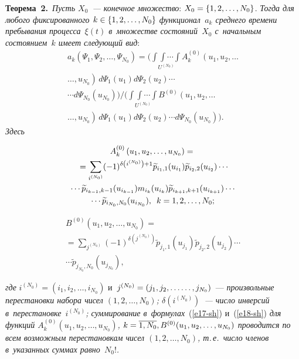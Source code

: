 \begin{multicols}{2}
\noindent
\textbf{Теорема~2.}\ \textit{Пусть $X_{0}$~--- конечное множество}: 
$X_{0}\hm=\{1,2,\dots,N_0 \}$. \textit{Тогда для любого фиксированного $k\hm\in \{1,2,\ldots 
,N_0\}$ функционал~$a_{k} $ среднего времени пребывания процесса~$\xi (t)$ 
в~множестве состояний~$X_{0} $ с~начальным состоянием~$k$ имеет сле\-ду\-ющий вид}:
\begin{multline}
\!a_{k} \left(\Psi_{1} ,\Psi_{2} ,\dots ,\Psi_{N_0} \right)\!=\!
\Bigg(\underset{U^{(N_0)}}{\int\!\!\!\int\cdots\int} A^{(0)}_{k} \left(u_{1} ,u_{2} 
,\ldots\right.\\
\left.\ldots ,u_{N_0} \right)\,d\Psi _{1} (u_{1} )d\Psi _{2} (u_{2} )\cdots\\
\cdots d\Psi _{N_0} (u_{N_0} )  
\Big)\!\!\Bigg/\!\!\Bigg(\underset{U^{(N_0)}}{\int\!\!\!\int\cdots\int} B^{(0)}\left(u_{1} ,u_{2} ,\ldots\right.\\
\left.\ldots ,u_{N_0} 
\right)\,d\Psi_{1} (u_{1} )d\Psi _{2} (u_{2} )\cdots d\Psi_{N_0} (u_{N_0})  \Bigg).
\label{e16-sh}
\end{multline}
\textit{Здесь}

\vspace*{-6pt}

\noindent
\begin{multline}
A^{(0)}_k\left(u_1, u_2,\ldots ,u_{N_0}\right)={}\\
{}=\sum\limits_{i^{(N_0)}}
(-1)^{\delta\left(i^{(N_0)}\right)+1}\widetilde{p}_{i_1,1}(u_{i_1})\widetilde{p}_{i_2,2}
(u_{i_2})\cdots\\
\cdots \widetilde{p}_{i_{k-1},k-1}(u_{i_{k-1}})m_{i_k}(u_{i_k})
\widetilde{p}_{i_{k+1},k+1}(u_{i_{k+1}})\cdots\\
\cdots \widetilde{p}_{i_{N_0},N_0}
(u_{i_{N_0}}),\enskip k=1,2,\ldots ,N_0;
\label{e17-sh}
\end{multline}

\vspace*{-14pt}

\noindent
\begin{multline}
B^{(0)}\left(u_1,u_2,\ldots ,u_{N_0}\right)={}\\
{}=\sum\limits_{j^{(N_0)}}
(-1)^{\delta(j^{(N_0)})}\widetilde{p}_{j_1,1}(u_{j_1})\widetilde{p}_{j_2,2}(u_{j_2})\cdots\\
\cdots 
\widetilde{p}_{j_{N_0},N_0}(u_{j_{N_0}}),
\label{e18-sh}
\end{multline}

\vspace*{-4pt}

\noindent
\textit{где}
$i^{(N_0)}=(i_1, i_2,\ldots ,i_{N_0})$ и~$j^{(N_0)}\hm=(j_1, j_2,\ldots\linebreak \ldots ,j_{N_0})$~--- 
\textit{произвольные перестановки набора чисел $(1,2,\ldots ,N_0)$;
$\delta(i^{(N_0)})$~--- число инверсий в~перестановке~$i^{(N_0)}$; суммирование 
в~формулах}~(\ref{e17-sh}) и~(\ref{e18-sh}) \textit{для функций
$A_k^{(0)}(u_1, u_2,\ldots ,u_{N_0})$, $k\hm=\overline{1,N_0}, B^{(0)}(u_1,u_2,\ldots,u_{N_0})$ проводится 
по всем возможным перестановкам чисел $(1,2,\ldots ,N_0)$, т.\,е.\ \mbox{число} членов 
в~указанных суммах рав\-но~$N_0!$.}


\end{multicols}
